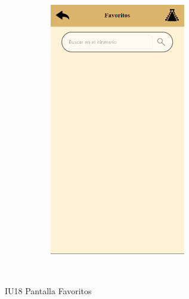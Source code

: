 \begin{figure}[htb]
    \begin{minipage}{1\textwidth}
        \centering
        \includegraphics[width=10cm, height=11cm]{entregable final/pantallasSistema/IU18 Pantalla Favoritos.png}
        \caption{IU18 Pantalla Favoritos}
    \end{minipage}
    \\
\end{figure}
